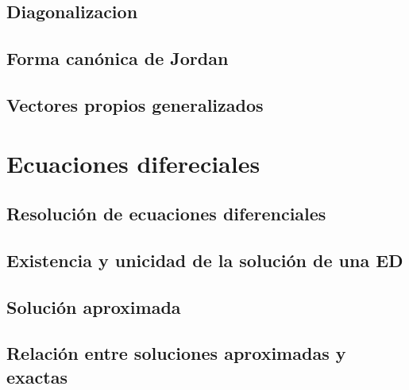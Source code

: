 \documentclass{tufte-book}
\numberwithin{equation}{chapter}
\begin{document}
    \chapter{Diagonalizacion}
    \chapter{Forma canónica de Jordan}
    \chapter{Vectores propios generalizados}
  \part{Ecuaciones difereciales}
    \chapter{Resolución de ecuaciones diferenciales}
    \chapter{Existencia y unicidad de la solución de una ED}
    \chapter{Solución aproximada}
    \chapter{Relación entre soluciones aproximadas y exactas}
\end{document}
